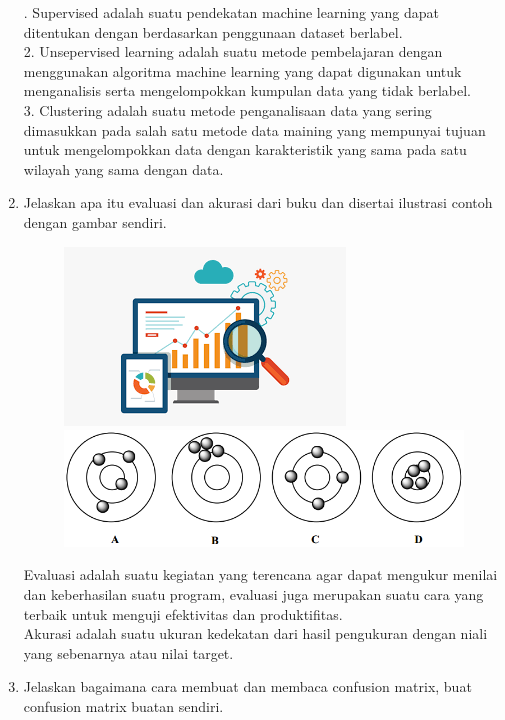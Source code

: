 \begin{enumerate}
\begin{figure}[!htbp]
    \end{figure}
    . Supervised adalah suatu pendekatan machine learning yang dapat ditentukan dengan berdasarkan penggunaan dataset berlabel.\\
2. Unsepervised learning adalah suatu metode pembelajaran dengan menggunakan algoritma machine learning yang dapat digunakan untuk menganalisis serta mengelompokkan kumpulan data yang tidak berlabel.\\
3. Clustering adalah suatu metode penganalisaan data yang sering dimasukkan pada salah satu metode data maining yang mempunyai tujuan untuk mengelompokkan data dengan karakteristik yang sama pada satu wilayah yang sama dengan data.
\item
Jelaskan apa itu evaluasi dan akurasi dari buku dan disertai ilustrasi contoh dengan gambar sendiri.\\
\begin{figure}[!htbp]
		\centering
		\includegraphics[scale=0.4]{figures/chapter2/evaluasi.png}
		\includegraphics[scale=0.4]{figures/chapter2/akurasi.png}
    \end{figure}
    \newpage
Evaluasi adalah suatu kegiatan yang terencana agar dapat mengukur menilai dan keberhasilan suatu program, evaluasi juga merupakan suatu cara yang terbaik untuk menguji efektivitas dan produktifitas.\\
Akurasi adalah suatu ukuran kedekatan dari hasil pengukuran dengan niali yang sebenarnya atau nilai target.
\item
Jelaskan bagaimana cara membuat dan membaca confusion matrix, buat confusion matrix buatan sendiri.
\begin{figure}[!htbp]

\end{figure}
\end{enumerate}
